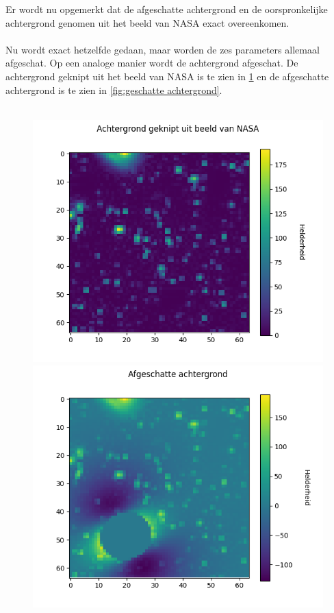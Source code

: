 Er wordt nu opgemerkt dat de afgeschatte achtergrond en de oorspronkelijke achtergrond genomen uit het beeld van NASA exact overeenkomen.\\ \\
Nu wordt exact hetzelfde gedaan, maar worden de zes parameters allemaal afgeschat. Op een analoge manier wordt de achtergrond afgeschat. De achtergrond geknipt uit het beeld van NASA is te zien in \cref{fig:achtergrond nasa} en de afgeschatte achtergrond is te zien in \cref{fig:geschatte achtergrond}.
\\ \\
\begin{figure}
    \begin{minipage}{0.98\linewidth}
        \centering
        \includegraphics[width=0.95\linewidth]{Figures/sersic_achtergrond2.png}
        \label{fig:achtergrond nasa}
        \centering
        \includegraphics[width=0.95\linewidth]{Figures/afgeschatte_achtergrond2.png}

\end{minipage}
\end{figure}
